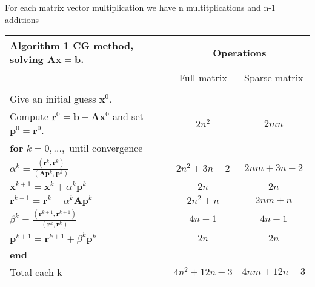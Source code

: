 \documentclass[a4paper,10pt]{report}
\begin{document}
For each matrix vector multiplication we have n multitplications and n-1 additions 
 \begin{table}[!h]
\begin{tabular}{ |l|c|c| } 
\hline
  \textbf{Algorithm 1} CG method, solving $\mathbf{A}\mathbf{x}=\mathbf{b}$.& \multicolumn{2}{|c|}{Operations}\\
  \hline
&Full matrix&Sparse matrix\\
 \hline
&&\\
Give an initial guess $\mathbf{x}^0$. &&\\
Compute $\mathbf{r}^0=\mathbf{b}-\mathbf{A}\mathbf{x}^0$ and set $\mathbf{p}^0=\mathbf{r}^0$.&$2n^2$&$2mn$\\
\hline
\hspace{0.5cm}\textbf{for} $k=0,...,$ until convergence&&\\
 \hspace{1cm} $\alpha^k=\frac{(\mathbf{r}^{k},\mathbf{r}^{k})}{(\mathbf{A}\mathbf{p}^k,\mathbf{p}^k)}$&$2n^2+3n-2$&$2nm+3n-2$\\
\hspace{1cm} $\mathbf{x}^{k+1}=\mathbf{x}^k+\alpha^k\mathbf{p}^k$&$2n$&$2n$\\
\hspace{1cm}$\mathbf{r}^{k+1}=\mathbf{r}^k-\alpha^k\mathbf{A}\mathbf{p}^k$&$2n^2+n$&$2nm+n$\\
\hspace{1cm}$ \beta^k=\frac{(\mathbf{r}^{k+1},\mathbf{r}^{k+1})}{(\mathbf{r}^k,\mathbf{r}^k)}$&$4n-1$&$4n-1$\\
\hspace{1cm}$\mathbf{p}^{k+1}=\mathbf{r}^{k+1}+\beta^k\mathbf{p}^k$&$2n$&$2n$\\
\hspace{0.5cm}\textbf{end}&&\\
\hline
Total each k&$4n^2+12n-3$&$4nm+12n-3$\\
\hline
\end{tabular}
\end{table}
\end{document}
